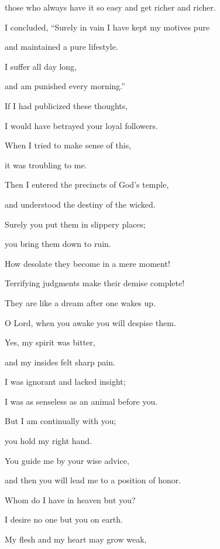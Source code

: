 {\par }{\Q those who always
have it so easy
and get richer
and richer.
\par }{\Q {}I concluded, “Surely
in vain
I have kept my motives
pure
\par }{\Q and maintained
a pure
lifestyle.
\par }{\Q {}I suffer
all
day
long,
\par }{\Q and am punished
every morning.”
\par }{\Q {}If
I had publicized
these thoughts,

\par }{\Q I would have betrayed
your loyal followers.
\par }{\Q {}When I tried
to make sense
of this,
\par }{\Q it
was troubling
to me.
\par }{\Q {}Then I entered
the precincts of God’s
temple,
\par }{\Q and understood
the destiny of the wicked.
\par }{\Q {}Surely
you put
them in slippery places;
\par }{\Q you bring
them down
to ruin.
\par }{\Q {}How
desolate
they become
in a mere moment!
\par }{\Q Terrifying judgments
make their demise
complete!
\par }{\Q {}They are like a dream
after one wakes up.
\par }{\Q O Lord,
when you awake
you will despise
them.
\par }{\Q {}Yes,
my spirit
was bitter,
\par }{\Q and my insides
felt sharp pain.
\par }{\Q {}I
was ignorant
and lacked insight;
\par }{\Q I was as senseless
as an animal before you.
\par }{\Q {}But I
am continually
with
you;
\par }{\Q you hold
my right
hand.
\par }{\Q {}You guide me by your wise advice,
\par }{\Q and then
you will lead
me to a position
of honor.
\par }{\Q {}Whom
do I have in heaven
but you?
\par }{\Q I desire
no
one but you on earth.
\par }{\Q {}My flesh
and my heart
may grow
weak,

}
